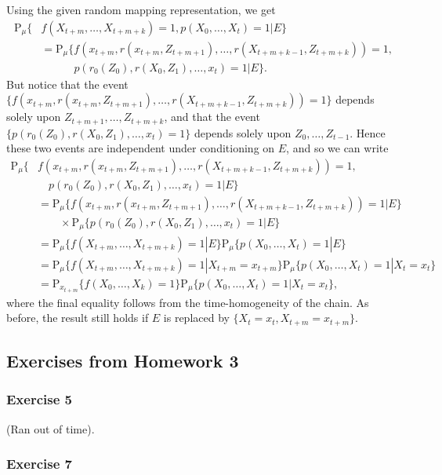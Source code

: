 \documentclass[12pt]{article}
\newcommand{\Prob}{\mathrm{P}}
\begin{document}
Using the given random mapping representation, we get
\begin{align*}
\Prob_\mu\{&f(X_{t+m}, \ldots, X_{t+m+k}) = 1, p(X_0, \ldots, X_t) = 1 | E\} \\
&= \Prob_\mu\{f(x_{t+m}, r(x_{t+m}, Z_{t+m+1}), \ldots, r(X_{t+m+k-1}, Z_{t+m+k})) = 1, \\
&\qquad \quad p(r_0(Z_0), r(X_0, Z_1), \ldots, x_t) = 1 | E\}.
\end{align*}
But notice that the event $\{f(x_{t+m}, r(x_{t+m}, Z_{t+m+1}), \ldots, r(X_{t+m+k-1}, Z_{t+m+k})) = 1\}$ depends solely upon $Z_{t+m+1}, \ldots, Z_{t+m+k}$, and that the event $\{p(r_0(Z_0), r(X_0, Z_1), \ldots, x_t) = 1\}$ depends solely upon $Z_0, \ldots, Z_{t-1}$. Hence these two events are independent under conditioning on $E$, and so we can write
\begin{align*}
\Prob_\mu\{&f(x_{t+m}, r(x_{t+m}, Z_{t+m+1}), \ldots, r(X_{t+m+k-1}, Z_{t+m+k})) = 1, \\
& \quad p(r_0(Z_0), r(X_0, Z_1), \ldots, x_t) = 1 | E\} \\
&= \Prob_\mu\{f(x_{t+m}, r(x_{t+m}, Z_{t+m+1}), \ldots, r(X_{t+m+k-1}, Z_{t+m+k})) = 1 | E\} \\
&\qquad \times \Prob_\mu\{p(r_0(Z_0), r(X_0, Z_1), \ldots, x_t) = 1 | E\} \\
&= \Prob_\mu\{f(X_{t+m}, \ldots, X_{t+m+k}) = 1 | E\} \Prob_\mu\{p(X_0, \ldots, X_t) = 1 | E\} \\
&= \Prob_\mu\{f(X_{t+m}, \ldots, X_{t+m+k}) = 1 | X_{t+m} = x_{t+m}\} \Prob_\mu\{p(X_0, \ldots, X_t) = 1 | X_t = x_t\} \\
&= \Prob_{x_{t+m}}\{f(X_0, \ldots, X_k) = 1\} \Prob_\mu\{p(X_0, \ldots, X_t) = 1 | X_t = x_t\},
\end{align*}
where the final equality follows from the time-homogeneity of the chain. As before, the result still holds if $E$ is replaced by $\{X_t = x_t, X_{t+m} = x_{t+m}\}$.

\subsection*{Exercises from Homework 3}

\subsubsection*{Exercise 5}

(Ran out of time).

\subsubsection*{Exercise 7}
\end{document}
